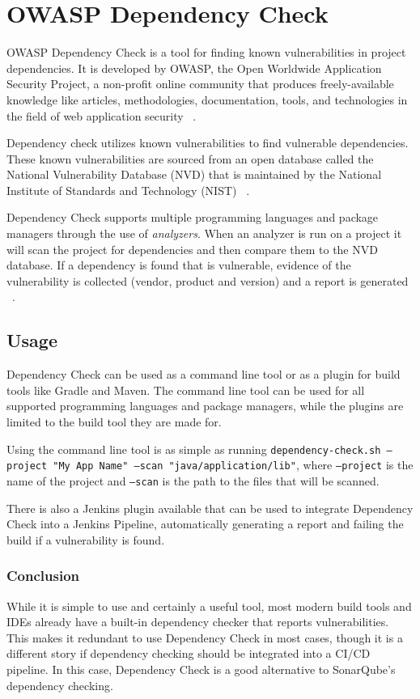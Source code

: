 \section{OWASP Dependency Check}\label{sec:owasp-dependency-check}

OWASP Dependency Check is a tool for finding known vulnerabilities in project dependencies.
It is developed by OWASP, the Open Worldwide Application Security Project,
a non-profit online community that produces freely-available knowledge like articles,
methodologies, documentation, tools, and technologies in the field of web application security ~\cite{owasp-about}.

Dependency check utilizes known vulnerabilities to find vulnerable dependencies.
These known vulnerabilities are sourced from an open database called the National Vulnerability Database (NVD) that is maintained
by the National Institute of Standards and Technology (NIST) ~\cite{nvd}.

Dependency Check supports multiple programming languages and package managers through the use of \emph{analyzers}.
When an analyzer is run on a project it will scan the project for dependencies and then compare them to the NVD database.
If a dependency is found that is vulnerable,
evidence of the vulnerability is collected (vendor, product and version) and a report is generated ~\cite{owasp-dependency-check-work}.

\subsection{Usage}\label{subsec:depencency-check-usage}

Dependency Check can be used as a command line tool or as a plugin for build tools like Gradle and Maven.
The command line tool can be used for all supported programming languages and package managers, while the plugins are limited to the build tool they are made for.

Using the command line tool is as simple as running \texttt{\scriptsize dependency-check.sh --project "My App Name" --scan "java/application/lib"}, where \texttt{\scriptsize--project} is the name of the project and \texttt{\scriptsize--scan} is the path to the files that will be scanned.

There is also a Jenkins plugin available that can be used to integrate Dependency Check into a Jenkins Pipeline,
automatically generating a report and failing the build if a vulnerability is found.

\subsubsection{Conclusion}\label{subsubsec:depencency-check-conclusion}

While it is simple to use and certainly a useful tool,
most modern build tools and IDEs already have a built-in dependency checker that reports vulnerabilities.
This makes it redundant to use Dependency Check in most cases, though it is a different story if dependency checking should be integrated into a CI/CD pipeline.
In this case, Dependency Check is a good alternative to SonarQube's dependency checking.

